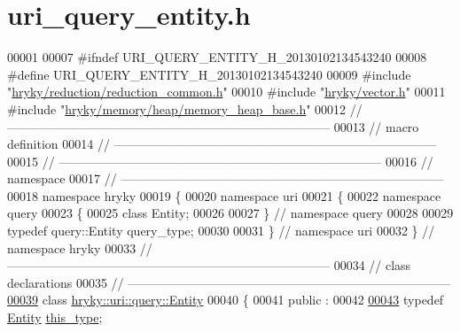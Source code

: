 \hypertarget{uri__query__entity_8h_source}{\section{uri\-\_\-query\-\_\-entity.\-h}
}

\begin{DoxyCode}
00001 
00007 \textcolor{preprocessor}{#ifndef URI\_QUERY\_ENTITY\_H\_20130102134543240}
00008 \textcolor{preprocessor}{}\textcolor{preprocessor}{#define URI\_QUERY\_ENTITY\_H\_20130102134543240}
00009 \textcolor{preprocessor}{}\textcolor{preprocessor}{#include "\hyperlink{reduction__common_8h}{hryky/reduction/reduction_common.h}"}
00010 \textcolor{preprocessor}{#include "\hyperlink{vector_8h}{hryky/vector.h}"}
00011 \textcolor{preprocessor}{#include "\hyperlink{memory__heap__base_8h}{hryky/memory/heap/memory_heap_base.h}"}
00012 \textcolor{comment}{//
      ------------------------------------------------------------------------------}
00013 \textcolor{comment}{// macro definition}
00014 \textcolor{comment}{//
      ------------------------------------------------------------------------------}
00015 \textcolor{comment}{//
      ------------------------------------------------------------------------------}
00016 \textcolor{comment}{// namespace}
00017 \textcolor{comment}{//
      ------------------------------------------------------------------------------}
00018 \textcolor{keyword}{namespace }hryky
00019 \{
00020 \textcolor{keyword}{namespace }uri
00021 \{
00022 \textcolor{keyword}{namespace }query
00023 \{
00025     \textcolor{keyword}{class }Entity;
00026 
00027 \} \textcolor{comment}{// namespace query}
00028 
00029 \textcolor{keyword}{typedef} query::Entity query\_type;
00030 
00031 \} \textcolor{comment}{// namespace uri}
00032 \} \textcolor{comment}{// namespace hryky}
00033 \textcolor{comment}{//
      ------------------------------------------------------------------------------}
00034 \textcolor{comment}{// class declarations}
00035 \textcolor{comment}{//
      ------------------------------------------------------------------------------}
\hypertarget{uri__query__entity_8h_source_l00039}{}\hyperlink{classhryky_1_1uri_1_1query_1_1_entity}{00039} \textcolor{comment}{}\textcolor{keyword}{class }\hyperlink{classhryky_1_1uri_1_1query_1_1_entity}{hryky::uri::query::Entity}
00040 \{
00041 \textcolor{keyword}{public} :
00042 
\hypertarget{uri__query__entity_8h_source_l00043}{}\hyperlink{classhryky_1_1uri_1_1query_1_1_entity_a169f59d5b5b0d125a9128047e916f802}{00043}     \textcolor{keyword}{typedef} \hyperlink{classhryky_1_1uri_1_1query_1_1_entity}{Entity} \hyperlink{classhryky_1_1uri_1_1query_1_1_entity_a169f59d5b5b0d125a9128047e916f802}{this_type};

\end{DoxyCode}
